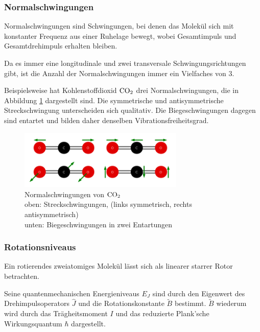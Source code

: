 \documentclass[12pt,a4paper]{scrartcl}
\numberwithin{equation}{section} %
\begin{document}
\subsubsection{Normalschwingungen}
\label{Normalschwingungen}

Normalschwingungen sind Schwingungen, bei denen das Molekül sich mit konstanter Frequenz aus einer Ruhelage bewegt, wobei Gesamtimpuls und Gesamtdrehimpuls erhalten bleiben.

Da es immer eine longitudinale und zwei transversale Schwingungsrichtungen gibt, ist die Anzahl der Normalschwingungen immer ein Vielfaches von $3$. \cite{Gerthsen}

Beispielsweise hat Kohlenstoffdioxid $\ce{CO_2}$ drei Normalschwingungen, die in Abbildung \ref{abb:Normalschwingungen CO2} dargestellt sind. Die symmetrische und antisymmetrische Streckschwingung unterscheiden sich qualitativ. Die Biegeschwingungen dagegen sind entartet und bilden daher denselben Vibrationsfreiheitsgrad.

\begin{figure}[h!]
	\centering
	\includegraphics[width=0.7\textwidth]{../media/B1.1/Normalschwingung_CO2.png}
	\caption{Normalschwingungen von $\ce{CO_2}$ \cite{abb:Schwingungen CO2}\\
		oben: Streckschwingungen, (links symmetrisch, rechts antisymmetrisch)\\
		unten: Biegeschwingungen in zwei Entartungen}
	\label{abb:Normalschwingungen CO2}
\end{figure}

\subsubsection{Rotationsniveaus}
Ein rotierendes zweiatomiges Molekül lässt sich als linearer starrer Rotor betrachten.

Seine quantenmechanischen Energieniveaus $E_J$ sind durch den Eigenwert des Drehimpulsoperators $\hat J$ und die Rotationskonstante $\tilde{B}$ bestimmt. $\tilde{B}$  wiederum wird durch das Trägheitsmoment $I$ und das reduzierte Plank'sche Wirkungsquantum $\hbar$ dargestellt.
\end{document}
